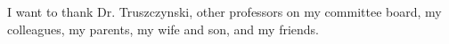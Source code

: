 I want to thank Dr. Truszczynski, other professors on my committee board, my colleagues,
my parents, my wife and son, and my friends.
